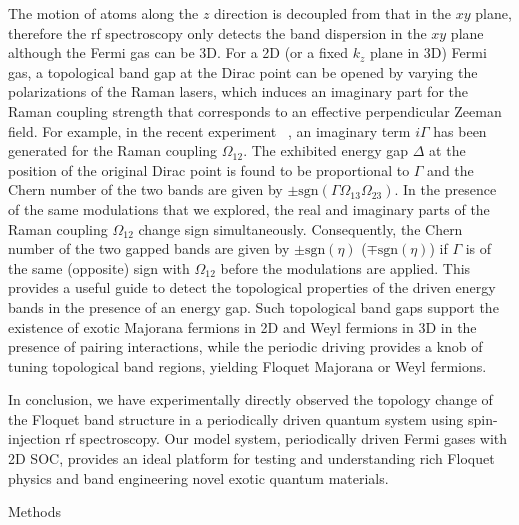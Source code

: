 \documentclass[aps,prl,twocolumn,floatfix,reprint]{revtex4}
\begin{document}
The motion of atoms along the $z$ direction is decoupled from that in the $%
xy $ plane, therefore the rf spectroscopy only detects the band dispersion
in the $xy$ plane although the Fermi gas can be 3D. For a 2D (or a fixed $%
k_{z}$ plane in 3D) Fermi gas, a topological band gap at the Dirac point can
be opened by varying the polarizations of the Raman lasers, which induces an
imaginary part for the Raman coupling strength that corresponds to an
effective perpendicular Zeeman field. For example, in the recent experiment~%
\cite{Meng15}, an imaginary term $i\Gamma $ has been generated for the Raman
coupling $\Omega _{12}$. The exhibited energy gap $\Delta $ at the position
of the original Dirac point is found to be proportional to $\Gamma $ and the
Chern number of the two bands are given by $\pm \text{sgn}(\Gamma \Omega
_{13}\Omega _{23})$. In the presence of the same modulations that we
explored, the real and imaginary parts of the Raman coupling $\Omega _{12}$
change sign simultaneously. Consequently, the Chern number of the two gapped
bands are given by $\pm \text{sgn}(\eta )$ ($\mp \text{sgn}(\eta )$) if $%
\Gamma $ is of the same (opposite) sign with $\Omega _{12}$ before the
modulations are applied. This provides a useful guide to detect the
topological properties of the driven energy bands in the presence of an
energy gap. Such topological band gaps support the existence of exotic
Majorana fermions in 2D and Weyl fermions in 3D in the presence of pairing
interactions, while the periodic driving provides a knob of tuning
topological band regions, yielding Floquet Majorana or Weyl fermions.

In conclusion, we have experimentally directly observed the topology change
of the Floquet band structure in a periodically driven quantum system using
spin-injection rf spectroscopy. Our model system, periodically driven Fermi
gases with 2D SOC, provides an ideal platform for testing and understanding
rich Floquet physics and band engineering novel exotic quantum materials.

{\Large Methods}
\end{document}
